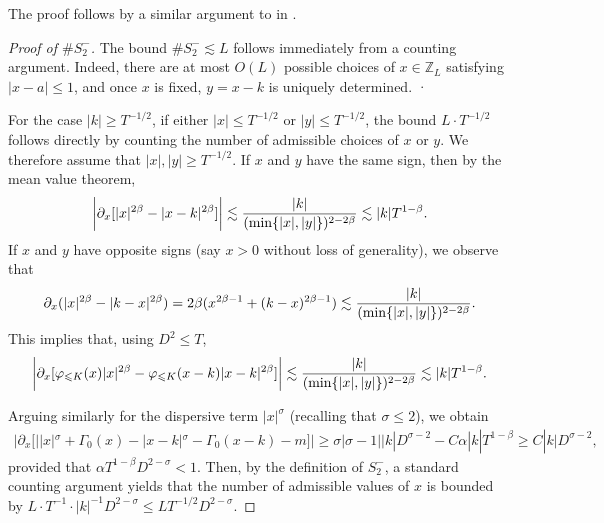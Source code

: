 \documentclass[UTF-8,reqno]{amsart}
\numberwithin{equation}{section}
\theoremstyle{definition}
\def\min{{\mathord{{\rm min}}}}
\def\geq{\geqslant}
\def\leq{\leqslant}
\def\min{{\mathord{{\rm min}}}}
\def\geq{\geqslant}
\def\leq{\leqslant}
\begin{document}
The proof follows by a similar  argument to in \cite[Section 3.8]{DIP25}.
\begin{proof}[Proof of $\#S_2^-$]
The bound $\#S_2^- \lesssim L$ follows immediately from a counting argument. Indeed, there are at most $O(L)$ possible choices of $x\in\mathbb{Z}_L$ satisfying $|x-a|\leq 1$, and once $x$ is fixed, $y = x - k$  is uniquely determined. ·

For the case $|k| \geq T^{-1/2}$, if either $|x| \leq T^{-1/2}$ or $|y| \leq T^{-1/2}$, the bound $L\cdot T^{-1/2}$ follows directly by counting the number of admissible choices of $x$ or $y$.
We therefore assume that $|x|,|y|\geq T^{-1/2}$. If $x$ and $y$ have the same sign, then by the mean value theorem, 
 \begin{align*}
        \bigg|\partial_x[|x|^{2\beta}-|x-k|^{2\beta}]\bigg|\lesssim \frac{|k|}{(\min\{|x|,|y|\})^{2-2\beta}}\lesssim |k|T^{1-\beta}.
    \end{align*} 
   If $x$ and $y$ have opposite signs (say $x>0$ without loss of generality), we observe that $$\partial_x(|x|^{2\beta}-|k-x|^{2\beta})=2\beta(x^{2\beta-1}+(k-x)^{2\beta-1})\lesssim  \frac{|k|}{(\min\{|x|,|y|\})^{2-2\beta}}.$$
    This implies that, using $D^2\leq T$,
    \begin{align*}
        \bigg|\partial_x[\varphi_{\leq K}(x)|x|^{2\beta}-\varphi_{\leq K}(x-k)|x-k|^{2\beta}]\bigg|\lesssim \frac{|k|}{(\min\{|x|,|y|\})^{2-2\beta}}\lesssim |k|T^{1-\beta}.
    \end{align*} 

   Arguing similarly for the dispersive term $|x|^\sigma$ (recalling that $\sigma\leq 2$), we obtain
    \begin{align}
       \bigg| \partial_x[||x|^\sigma+\Gamma_0(x)-|x-k|^\sigma-\Gamma_0(x-k)-m]\bigg|\geq \sigma|\sigma-1||k|D^{\sigma-2}-C\alpha |k|T^{1-\beta}\geq C|k|D^{\sigma-2},\label{bd:counting}
    \end{align}
    provided that $\alpha T^{1-\beta}D^{2-\sigma}<1$. Then, by the definition of $S_2^-$, a standard counting argument yields that the number of admissible values of $x$ is bounded by  $L\cdot T^{-1}\cdot |k|^{-1}D^{2-\sigma}\leq LT^{-1/2}D^{2-\sigma}$.
\end{proof}
\end{document}
